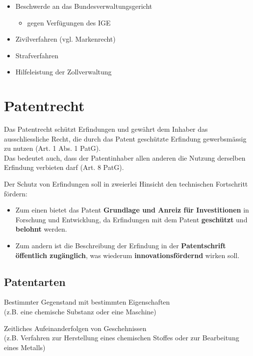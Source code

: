 \begin{itemize}
	\tightlist
	\item Beschwerde an das Bundesverwaltungsgericht
	\begin{itemize}
		\tightlist
		\item gegen Verfügungen des IGE
	\end{itemize}
	\item Zivilverfahren (vgl. Markenrecht)
	\item Strafverfahren
	\item Hilfeleistung der Zollverwaltung
\end{itemize}

\section{Patentrecht}
\label{sec:Patentrecht-Zweck}

Das Patentrecht schützt Erfindungen und gewährt dem Inhaber das
ausschliessliche Recht, die durch das Patent geschützte Erfindung
gewerbsmässig zu nutzen (Art. 1 Abs. 1 PatG).\\
Das bedeutet auch, dass der Patentinhaber allen anderen die Nutzung
derselben Erfindung verbieten darf (Art. 8 PatG).

Der Schutz von Erfindungen soll in zweierlei Hinsicht den technischen
Fortschritt fördern:
\begin{itemize}
	\tightlist
	\item Zum einen bietet das Patent \textbf{Grundlage und Anreiz
	für Investitionen} in Forschung und Entwicklung, da Erfindungen mit dem
	Patent \textbf{geschützt} und \textbf{belohnt} werden.
	\item Zum andern ist die Beschreibung
	der Erfindung in der \textbf{Patentschrift öffentlich zugänglich}, was
	wiederum \textbf{innovationsfördernd} wirken soll.
\end{itemize}


\subsection{Patentarten}

\begin{description}
	\tightlist
	\item[Erzeugnispatent]  Bestimmter Gegenstand mit bestimmten Eigenschaften\\
	(z.B. eine chemische Substanz oder eine Maschine)
	\item[Verfahrenspatent] Zeitliches Aufeinanderfolgen von Geschehnissen\\
	(z.B. Verfahren zur Herstellung eines chemischen Stoffes oder zur
	Bearbeitung eines Metalls)
\end{description}



